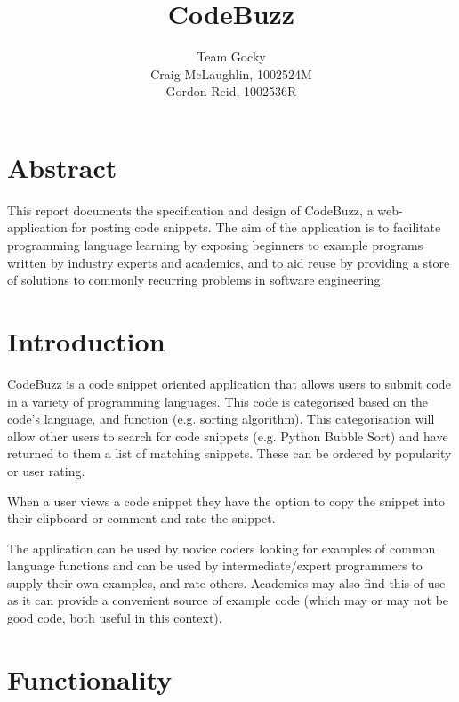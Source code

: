 \documentclass[11pt,a4paper]{article}
\title{CodeBuzz}
\author{Team Gocky \\
    Craig McLaughlin, 1002524M \\
    Gordon Reid, 1002536R}
\begin{document}
\maketitle

\newpage

\section*{Abstract}

This report documents the specification and design of CodeBuzz,
a web-application for posting code snippets. The aim of the application is
to facilitate programming language learning by exposing beginners to
example programs written by industry experts and academics, and to
aid reuse by providing a store of solutions to commonly recurring
problems in software engineering. 
\newpage

\tableofcontents
\newpage

\section{Introduction}

CodeBuzz is a code snippet oriented application that allows users to submit code
in a variety of programming languages. This code is categorised based on the
code's language, and function (e.g. sorting algorithm). This categorisation
will allow other users to search for code snippets (e.g. Python Bubble Sort)
and have returned to them a list of matching snippets. These can be ordered
by popularity or user rating.

When a user views a code snippet they have the option to copy the snippet into
their clipboard or comment and rate the snippet.

The application can be used by novice coders looking for examples of common
language functions and can be used by intermediate/expert programmers to supply
their own examples, and rate others. Academics may also find this of use as
it can provide a convenient source of example code (which may or may not be
good code, both useful in this context).

\section{Functionality}
\end{document}
